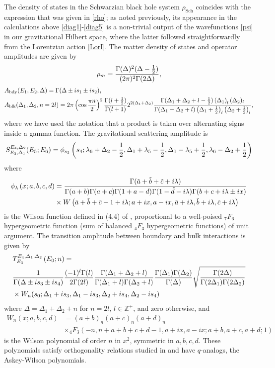 \documentclass[12pt]{article}
\newcommand{\be}{\begin{equation}}
\newcommand{\ee}{\end{equation}}
\newcommand{\nn}{\nonumber\\}
\newcommand{\ZZ}{\mathbb{Z}}
\DeclareMathOperator{\Sch}{Sch}
\newcommand{\bdy}{\text{bdy}}
\newcommand{\blk}{\text{blk}}
\newcommand{\Ga}{\Gamma}
\newcommand{\De}{\Delta}
\newcommand{\ov}{\over}
\begin{document}
The density of states in the Schwarzian black hole system $\rho_{\Sch}$ coincides with the expression that was given in \eqref{rho}; as noted previously, its appearance in the calculations above \eqref{diag1}-\eqref{diag5} is a non-trivial output of the wavefunctions \eqref{psi} in our gravitational Hilbert space, where the latter followed straightforwardly from the Lorentzian action \eqref{LorI}. The matter density of states and operator amplitudes are given by
\be \label{rhom}
\rho_{m}={\Ga(\De)^2 (\De-{1 \ov 2}) \ov (2\pi)^2 \Ga(2 \De)},
\ee
\begin{align} \label{amp}
&A_{\bdy}(E_1, E_2, \De) =\Ga(\De\pm i s_1 \pm is _2),\\
&A_{\blk}(\De_1, \De_2, n=2l)=2\pi\left(\cos{\pi n \over 2}\right)^2 {\Gamma(l+{1 \over 2}) \over \Gamma(l+1)}2 ^{2(\Delta_1+\Delta_2)}{\Gamma(\Delta_1+\Delta_2 + l-{1 \over 2}) \left(\Delta_1\right)_l (\Delta_2)_l\over \Gamma(\Delta_1+\Delta_2+l)\left(\Delta_1+{1 \over 2}\right)_l \left(\Delta_2+{1 \over 2}\right)_l},
\end{align}
where we have used the notation that a product is taken over alternating signs inside a gamma function. The gravitational scattering amplitude is
\be \label{Samp}
S^{E_4, \De_2}_{E_3, \De_1}(E_5; E_6)=\phi_{s_3}\left( s_4; \lambda_6+\Delta_2-{1 \over 2},  \Delta_1+\lambda_5-{1 \over 2},  \Delta_1-\lambda_5+{1 \over 2},  \lambda_6-\Delta_2+{1 \over 2}\right)
\ee
where 
\begin{align} \label{Wilf}
\phi_{\lambda}\left( x; a, b,c, d\right)&={\Gamma(\tilde{a}+\tilde{b}+\tilde{c}+i \lambda) \over \Gamma(a+b)\Gamma(a+c)\Gamma(1+a-d)\Gamma(1-\tilde{d}-i \lambda)\Gamma(b+c+i \lambda\pm i x)}\nn
&\times W\left( \tilde{a}+\tilde{b}+\tilde{c}-1+i \lambda; a+i x, a-i x, \tilde{a}+i \lambda, \tilde{b}+i \lambda, \tilde{c}+i \lambda\right)
\end{align}
is the Wilson function defined in (4.4) of \cite{Gro05}, proportional to a well-poised $_7 F_6$ hypergeometric function (sum of balanced $_4 F_3$ hypergeometric functions) of unit argument. The transition amplitude between boundary and bulk interactions is given by
\begin{align} \label{Tamp}
&T_{E_3}^{E_4, \Delta_1, \Delta_2}\left(E_0; n\right)=\\
&{1 \over \Gamma(\Delta\pm is_3  \pm is_4)}{(-1)^l \Gamma(l) \over 2 \Gamma(2 l)}{\Gamma(\Delta_1+\Delta_2+ l) \over \Gamma(\Delta_1+l)\Gamma(\Delta_2+l)}{\Gamma(\Delta_1)\Gamma(\Delta_2) \over \Gamma(\Delta)}\sqrt{{\Gamma(2 \Delta) \over \Gamma(2 \Delta_1)\Gamma(2 \Delta_2)}} \\
&\times W_{n}(s_0; \Delta_1+i s_3, \Delta_1-i s_3, \Delta_2+i s_4, \Delta_2-i s_4)
\end{align}
where $\De=\De_1+\De_2+n$ for $n=2l$, $l \in \ZZ^{+}$, and zero otherwise, and
\begin{align} \label{Wilp}
W_n(x; a, b, c, d)&=(a+b)_n(a+c)_n(a+d)_{n} \nn
&\times {}_{4} F_3\left( -n, n+a+b+c+d-1, a+i x, a-i x; a+b, a+c, a+d; 1\right)
\end{align}
is the Wilson polynomial of order $n$ in $x^2$, symmetric in $a, b, c, d$. These polynomials satisfy orthogonality relations studied in \cite{Wil80} and have $q$-analogs, the Askey-Wilson polynomials. 
\end{document}
